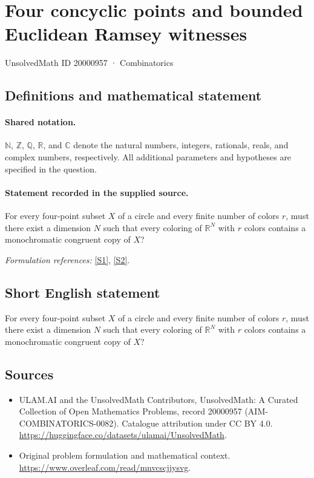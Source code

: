 \documentclass[11pt]{article}
\newcommand{\sref}[2]{\hyperlink{source:#1:#2}{[S#2]}}
\begin{document}
\setcounter{section}{20000956}
\section{Four concyclic points and bounded Euclidean Ramsey witnesses}\label{20000957}
{\small UnsolvedMath ID 20000957 · Combinatorics}
\subsection{Definitions and mathematical statement}

\paragraph{Shared notation.}$\mathbb N$, $\mathbb Z$, $\mathbb Q$, $\mathbb R$, and $\mathbb C$ denote the natural numbers, integers, rationals, reals, and complex numbers, respectively. All additional parameters and hypotheses are specified in the question.


\paragraph{Statement recorded in the supplied source.}
For every four-point subset $X$ of a circle and every finite number of colors $r$, must there exist a dimension $N$ such that every coloring of $\mathbb R^N$ with $r$ colors contains a monochromatic congruent copy of $X$?
\par\smallskip\textit{Formulation references:} \sref{20000957}{1}, \sref{20000957}{2}.
\subsection{Short English statement}
For every four-point subset $X$ of a circle and every finite number of colors $r$, must there exist a dimension $N$ such that every coloring of $\mathbb R^N$ with $r$ colors contains a monochromatic congruent copy of $X$?
\subsection{Sources}
\begin{itemize}
\item[\hypertarget{source:20000957:1}{S1}] ULAM.AI and the UnsolvedMath Contributors, UnsolvedMath: A Curated Collection of Open Mathematics Problems, record 20000957 (AIM-COMBINATORICS-0082). Catalogue attribution under CC BY 4.0.
\url{https://huggingface.co/datasets/ulamai/UnsolvedMath}.
\item[\hypertarget{source:20000957:2}{S2}] Original problem formulation and mathematical context.
\url{https://www.overleaf.com/read/mnvcscjjysvg}.
\end{itemize}
\label{end:20000957}
\end{document}
